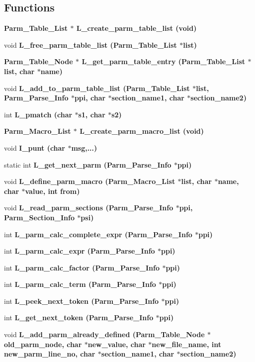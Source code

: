 \subsection*{Functions}
\begin{CompactItemize}
\item 
\bf{Parm\_\-Table\_\-List} $\ast$ \bf{L\_\-create\_\-parm\_\-table\_\-list} (void)
\item 
void \bf{L\_\-free\_\-parm\_\-table\_\-list} (\bf{Parm\_\-Table\_\-List} $\ast$\bf{list})
\item 
\bf{Parm\_\-Table\_\-Node} $\ast$ \bf{L\_\-get\_\-parm\_\-table\_\-entry} (\bf{Parm\_\-Table\_\-List} $\ast$\bf{list}, char $\ast$\bf{name})
\item 
void \bf{L\_\-add\_\-to\_\-parm\_\-table\_\-list} (\bf{Parm\_\-Table\_\-List} $\ast$\bf{list}, \bf{Parm\_\-Parse\_\-Info} $\ast$ppi, char $\ast$section\_\-name1, char $\ast$section\_\-name2)
\item 
int \bf{L\_\-pmatch} (char $\ast$s1, char $\ast$s2)
\item 
\bf{Parm\_\-Macro\_\-List} $\ast$ \bf{L\_\-create\_\-parm\_\-macro\_\-list} (void)
\item 
void \bf{I\_\-punt} (char $\ast$msg,...)
\item 
static int \bf{L\_\-get\_\-next\_\-parm} (\bf{Parm\_\-Parse\_\-Info} $\ast$ppi)
\item 
void \bf{L\_\-define\_\-parm\_\-macro} (\bf{Parm\_\-Macro\_\-List} $\ast$\bf{list}, char $\ast$\bf{name}, char $\ast$value, int from)
\item 
void \bf{L\_\-read\_\-parm\_\-sections} (\bf{Parm\_\-Parse\_\-Info} $\ast$ppi, \bf{Parm\_\-Section\_\-Info} $\ast$psi)
\item 
int \bf{L\_\-parm\_\-calc\_\-complete\_\-expr} (\bf{Parm\_\-Parse\_\-Info} $\ast$ppi)
\item 
int \bf{L\_\-parm\_\-calc\_\-expr} (\bf{Parm\_\-Parse\_\-Info} $\ast$ppi)
\item 
int \bf{L\_\-parm\_\-calc\_\-factor} (\bf{Parm\_\-Parse\_\-Info} $\ast$ppi)
\item 
int \bf{L\_\-parm\_\-calc\_\-term} (\bf{Parm\_\-Parse\_\-Info} $\ast$ppi)
\item 
int \bf{L\_\-peek\_\-next\_\-token} (\bf{Parm\_\-Parse\_\-Info} $\ast$ppi)
\item 
int \bf{L\_\-get\_\-next\_\-token} (\bf{Parm\_\-Parse\_\-Info} $\ast$ppi)
\item 
void \bf{L\_\-add\_\-parm\_\-already\_\-defined} (\bf{Parm\_\-Table\_\-Node} $\ast$old\_\-parm\_\-node, char $\ast$new\_\-value, char $\ast$new\_\-file\_\-name, int new\_\-parm\_\-line\_\-no, char $\ast$section\_\-name1, char $\ast$section\_\-name2)

\end{CompactItemize}
